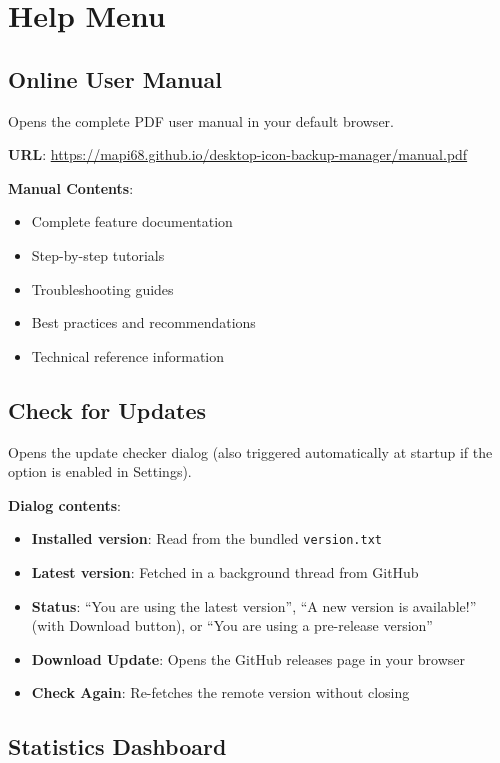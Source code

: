 \documentclass[a4paper,11pt]{article}
\begin{document}
\section{Help Menu}

\subsection{Online User Manual}

Opens the complete PDF user manual in your default browser.

\textbf{URL}:
\url{https://mapi68.github.io/desktop-icon-backup-manager/manual.pdf}

\textbf{Manual Contents}:
\begin{itemize}
  \item Complete feature documentation
  \item Step-by-step tutorials
  \item Troubleshooting guides
  \item Best practices and recommendations
  \item Technical reference information
\end{itemize}

\subsection{Check for Updates}

Opens the update checker dialog (also triggered automatically at
startup if the option is enabled in Settings).

\textbf{Dialog contents}:
\begin{itemize}
  \item \textbf{Installed version}: Read from the bundled \texttt{version.txt}
  \item \textbf{Latest version}: Fetched in a background thread from GitHub
  \item \textbf{Status}: ``You are using the latest version'',
    ``A new version is available!'' (with Download button),
    or ``You are using a pre-release version''
  \item \textbf{Download Update}: Opens the GitHub releases page in your browser
  \item \textbf{Check Again}: Re-fetches the remote version without closing
\end{itemize}

\subsection{Statistics Dashboard}
\end{document}
